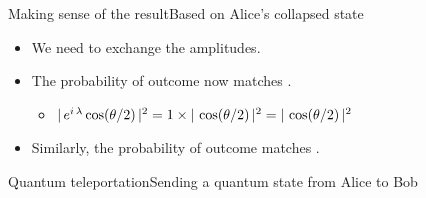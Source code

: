 \begin{frame}{Making sense of the result}{Based on Alice's collapsed state}
{\begin{itemize}
    \item<7-> We need to exchange the amplitudes.
    \item<8-> The probability of outcome  now matches \QState{\relax}.
    \begin{itemize}
        \item $|\,e^{i\,\lambda}\cos(\theta/2)\,|^{2} = 1\times|\,\cos(\theta/2)\,|^{2} = |\,\cos(\theta/2)\,|^{2}$
    \end{itemize}
    \item<9-> Similarly, the probability of outcome  matches \QState{\relax}.
\end{itemize}
}

\end{frame}

\begin{frame}{Quantum teleportation}{Sending a quantum state from Alice to Bob}


\end{frame}
